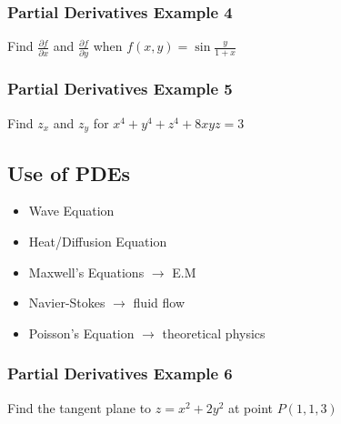 \documentclass[12pt]{article}
\begin{document}
\subsubsection{Partial Derivatives Example 4}
Find \(\frac{\partial f}{\partial x} \) and \(\frac{\partial f}{\partial y} \) when \(f(x,y) = \sin \frac{y}{1+x}\) 

\subsubsection{Partial Derivatives Example 5}
Find \(z_x\) and \(z_y\) for \(x^4 + y^4 + z^4 + 8xyz = 3\) 

\subsection{Use of PDEs}
\begin{itemize}
	\item Wave Equation
	\item Heat/Diffusion Equation
	\item Maxwell's Equations \(\rightarrow \) E.M
	\item Navier-Stokes \(\rightarrow \) fluid flow
	\item Poisson's Equation \(\rightarrow \) theoretical physics
\end{itemize}

\subsubsection{Partial Derivatives Example 6}
Find the tangent plane to \(z= x^2 + 2y^2\) at point \(P(1,1,3)\) 
\end{document}

